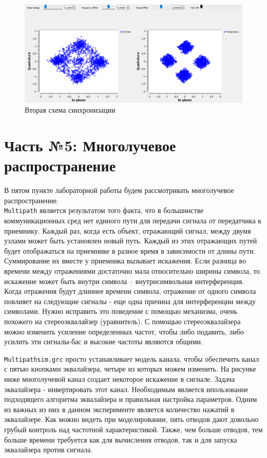 \documentclass[a4paper]{article}
\begin{document}
            \begin{figure}[H]
                \centering
                \includegraphics[width=\textwidth]{ex_4_3.png}
                \caption{Вторая схема синхронизации}
                \label{fig:ex_4_3}
            \end{figure}
            
    \newpage
        \section{Часть №5: Многолучевое распространение}
            В пятом пункте лабораторной работы будем рассмотривать многолучевое распространение. \\\texttt{Multipath} является результатом того факта, что в большинстве коммуникационных сред нет единого пути для передачи сигнала от передатчика к приемнику. Каждый раз, когда есть объект, отражающий сигнал, между двумя узлами может быть установлен новый путь. Каждый из этих отражающих путей будет отображаться на приемнике в разное время в зависимости от длины пути. Суммирование их вместе у приемника вызывает искажения. Если разница во времени между отражениями достаточно мала относительно ширины символа, то искажение может быть внутри символа – внутрисимвольная интерференция. Когда отражения будут длиннее времени символа, отражение от одного символа повлияет на следующие сигналы - еще одна причина для интерференции между символами. Нужно исправить это поведение с помощью механизма, очень похожего на стереоэквалайзер (уравнитель). С помощью стереоэквалайзера можно изменить усиление определенных частот, чтобы либо подавить, либо усилить эти сигналы-бас и высокие частоты являются общими.
            
            \texttt{Multipathsim.grc} просто устанавливает модель канала, чтобы обеспечить канал с пятью кнопками эквалайзера, четыре из которых можем изменить. На рисунке ниже многолучевой канал создает некоторое искажение в сигнале. Задача эквалайзера - инвертировать этот канал. Необходимым является ипользование подходящего алгоритма эквалайзера и правильная настройка параметров. Одним из важных из них в данном эксперименте является количество нажатий в эквалайзере. Как можно видеть при моделировании, пять отводов дают довольно грубый контроль над частотной характеристикой. Также, чем больше отводов, тем больше времени требуется как для вычисления отводов, так и для запуска эквалайзера против сигнала.
            
\end{document}
